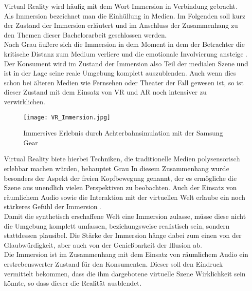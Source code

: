  Virtual Reality wird häufig mit dem Wort Immersion in Verbindung gebracht. Als Immersion bezeichnet man die Einhüllung in Medien. Im Folgenden soll kurz der Zustand der Immersion erläutert und im Anschluss der Zusammenhang zu den Themen dieser Bachelorarbeit geschlossen werden. \\

Nach Grau äußere sich die Immersion in dem Moment in dem der Betrachter die kritische Distanz zum Medium verliere und die emotionale Involvierung ansteige \cite[S.13]{Grau03}. Der Konsument wird im Zustand der Immersion also Teil der medialen Szene und ist in der Lage seine reale Umgebung komplett auszublenden. Auch wenn dies schon bei älteren Medien wie Fernsehen oder Theater der Fall gewesen ist, so ist dieser Zustand mit dem Einsatz von VR und AR noch intensiver zu verwirklichen.  \\

\begin{figure}[H]
\centering
\texttt{[image: VR\_Immersion.jpg]}
\caption{Immersives Erlebnis durch Achterbahnsimulation mit der Samsung Gear}
\label{fig:VR_Immersion}
\end{figure}
\newpage

Virtual Reality biete hierbei Techniken, die traditionelle Medien polysensorisch erlebbar machen würden, behauptet Grau \cite[S.15]{Grau03}  In diesem Zusammenhang wurde besonders der Aspekt der freien Kopfbewegung genannt, der es ermögliche die Szene aus unendlich vielen Perspektiven zu beobachten. Auch der Einsatz von räumlichem Audio sowie die Interaktion mit der virtuellen Welt erlaube ein noch stärkeres Gefühl der Immersion \cite[S.16]{Grau03}. \\
 
 Damit die synthetisch erschaffene Welt eine Immersion zulasse, müsse diese nicht die Umgebung komplett umfassen, beziehungsweise realistisch sein, sondern stattdessen plausibel\cite[S.17]{Grau03}. Die Stärke der Immersion hänge dabei zum einen von der Glaubwürdigkeit, aber auch von der Genießbarkeit der Illusion ab\cite[S.17]{Grau03}. \\
 
 Die Immersion ist im Zusammenhang mit dem Einsatz von räumlichem Audio ein erstrebenswerter Zustand für den Konsumenten. Dieser soll den Eindruck vermittelt bekommen, dass die ihm dargebotene virtuelle Szene Wirklichkeit sein könnte, so dass dieser die Realität ausblendet.
 
